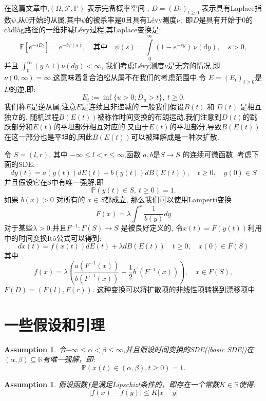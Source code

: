 \documentclass[12pt,final]{article}
\numberwithin{equation}{section}
\numberwithin{figure}{section}
\numberwithin{table}{section}
\theoremstyle{plain}
\newtheorem{assumption}[theorem]{Assumption} %
\theoremstyle{definition}
\theoremstyle{remark}
\begin{document}
在这篇文章中,$(\Omega,\mathcal{F},\mathbb{P})$ 表示完备概率空间 , $D=(D_t)_{t\geq0}$ 表示具有Laplace指数$\psi$,从0开始的从属,其中$\psi$的被杀率是0且具有Lévy测度$\nu;$ 即$D$是具有开始于0的càdlàg路径的一维非减Lévy过程,其Laplace变换是:
$$\mathbb{E}[e^{-sD_t}]=e^{-t\psi(s)},\quad\text{其中}\quad\psi(s)=\int\limits_0^\infty(1-e^{-sy})\:\nu(\text{d}y),\quad s>0,$$
并且 $\int_0^\infty(y\wedge1)\nu(dy) < \infty$,
我们考虑Lévy测度$\nu$是无穷的情况,即$\nu ( 0, \infty ) = \infty$,这意味着复合泊松从属不在我们的考虑范围中.令 $E=(E_t)_{t\geq0}$是$D$的逆,即:
$$E_t:=\inf\{u>0;D_u>t\},\:t\geq0.$$
我们称$E$是逆从属,注意$E$是连续且非递减的.一般我们假设$B(t)$ 和 $D(t)$ 是相互独立的. 随机过程$B(E(t))$被称作时间变换的布朗运动.我们注意到$D(t)$的跳跃部分和$E(t)$的平坦部分相互对应的.又由于$E(t)$的平坦部分,导致$B(E(t))$在这一部分也是平坦的,因此$B(E(t))$可以被理解成是一种次扩散.

令 $S=(l,r)$, 其中 $-\infty\leq l<r\leq\infty$,函数 $a,b$是$S\to S$ 的连续可微函数. 考虑下面的SDE:
$$dy(t)=a(y(t))dE(t)+b(y(t))dB(E(t)),\quad t\geq0,\quad y(0)\in S$$
并且假设它在S中有唯一强解,即
$$\mathbb{P}(y(t)\in S,\:t\geq0)=1.$$
如果 $b(x)>0$ 对所有的 $x\in S$都成立, 那么我们可以使用Lamperti变换
$$F(x)=\lambda\int^x\frac1{b(y)}dy$$
对于某些$\lambda>0.$并且$F^{-1}:F(S)\to S$ 是被良好定义的, 令$x(t)=F(y(t))$利用\cite{umarov2018beyond}中的时间变换Itô公式可以得到:
$$dx(t)=f(x(t))dE(t) + \lambda dB(E(t)) \quad t\geq0,\quad x(0)\in F(S)$$
其中
$$f(x)=\lambda\left(\frac{a(F^{-1}(x))}{b(F^{-1}(x))}-\frac12b^{\prime}(F^{-1}(x))\right),\quad x\in F(S),$$
$F(D)=(F(l),F(r)).$ 这种变换可以将扩散项的非线性项转换到漂移项中
\section{一些假设和引理}
\begin{assumption}\label{assum1}
	令$-\infty\leq\alpha<\beta\leq\infty$,并且假设时间变换的SDE(\ref{basic SDE})在$(\alpha,\beta)\subseteq\mathbb{R}$有唯一强解，即:$$\mathbb{P}(x(t)\in(\alpha,\beta), t\geq0)=1.$$
\end{assumption}
\begin{assumption}\label{assum2}
	假设函数$f$是满足Lipschizt条件的，即存在一个常数$K\in\mathbb{R}$使得:
	\begin{equation}
		|f(x)-f(y)| \le K|x-y|
	\end{equation}
\end{assumption}
\end{document}
